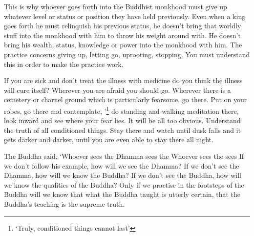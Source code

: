 This is why whoever goes forth into the Buddhist monkhood must give up whatever level or status or position they have held previously. Even when a king goes forth he must relinquish his previous status, he doesn't bring that worldly stuff into the monkhood with him to throw his weight around with. He doesn't bring his wealth, status, knowledge or power into the monkhood with him. The practice concerns giving up, letting go, uprooting, stopping. You must understand this in order to make the practice work.

If you are sick and don't treat the illness with medicine do you think the illness will cure itself? Wherever you are afraid you should go. Wherever there is a cemetery or charnel ground which is particularly fearsome, go there. Put on your robes, go there and contemplate, '\footnote{`Truly, conditioned things cannot last'} do standing and walking meditation there, look inward and see where your fear lies. It will be all too obvious. Understand the truth of all conditioned things. Stay there and watch until dusk falls and it gets darker and darker, until you are even able to stay there all night.

The Buddha said, `Whoever sees the Dhamma sees the  Whoever sees the  sees  If we don't follow his example, how will we see the Dhamma? If we don't see the Dhamma, how will we know the Buddha? If we don't see the Buddha, how will we know the qualities of the Buddha? Only if we practise in the footsteps of the Buddha will we know that what the Buddha taught is utterly certain, that the Buddha's teaching is the supreme truth.

